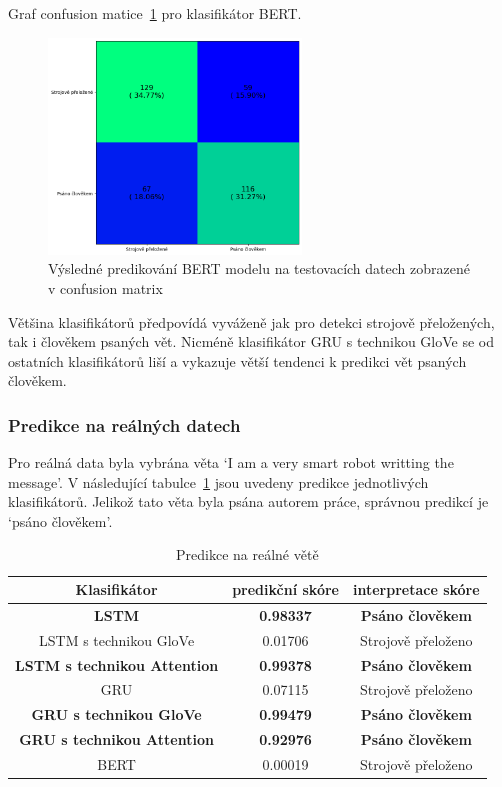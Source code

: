 Graf confusion matice~\ref{fig:EN BERT model conf} pro klasifikátor BERT.\@
\begin{figure}[H]
	\centering
	\includegraphics[width=0.6\textwidth]{Figures/EN_BERT_conf.png}
	\caption{Výsledné predikování BERT modelu na testovacích datech zobrazené v confusion matrix}\label{fig:EN BERT model conf}
\end{figure}

Většina klasifikátorů předpovídá vyváženě jak pro detekci strojově přeložených, tak i člověkem psaných vět.
Nicméně klasifikátor GRU s technikou GloVe se od ostatních klasifikátorů liší a vykazuje větší tendenci k predikci vět psaných člověkem.

\subsubsection{Predikce na reálných datech}
Pro reálná data byla vybrána věta `I am a very smart robot writting the message'.
V následující tabulce~\ref{tab:EN predikce} jsou uvedeny predikce jednotlivých klasifikátorů.
Jelikož tato věta byla psána autorem práce, správnou predikcí je `psáno člověkem'.

\begin{table}[H]
	\centering
	\caption{Predikce na reálné větě}\label{tab:EN predikce}
	\begin{tabular}{ c c c }
			\toprule
			Klasifikátor & predikční skóre & interpretace skóre\\
			\midrule
            \textbf{LSTM} & \textbf{0.98337} & \textbf{Psáno člověkem}\\
            LSTM s technikou GloVe & 0.01706 & Strojově přeloženo\\
            \textbf{LSTM s technikou Attention} & \textbf{0.99378} & \textbf{Psáno člověkem}\\
            GRU & 0.07115 & Strojově přeloženo\\
            \textbf{GRU s technikou GloVe} & \textbf{0.99479} & \textbf{Psáno člověkem}\\
            \textbf{GRU s technikou Attention} & \textbf{0.92976} & \textbf{Psáno člověkem}\\
            BERT & 0.00019 & Strojově přeloženo\\
			\midrule
		\end{tabular}
\end{table}

